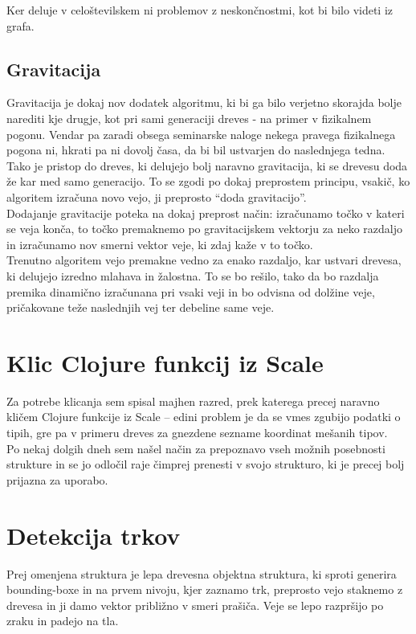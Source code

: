 \documentclass[10pt,a4paper,oneside]{book}
\def\pa{\\[-6pt]}
\begin{document}
Ker deluje v celoštevilskem ni problemov z neskončnostmi, kot bi bilo
videti iz grafa.

\subsection{Gravitacija}
Gravitacija je dokaj nov dodatek algoritmu, ki bi ga bilo verjetno
skorajda bolje narediti kje drugje, kot pri sami generaciji dreves -
na primer v fizikalnem pogonu. Vendar pa zaradi obsega seminarske
naloge nekega pravega fizikalnega pogona ni, hkrati pa ni dovolj časa,
da bi bil ustvarjen do naslednjega tedna.\pa

Tako je pristop do dreves, ki delujejo bolj naravno gravitacija, ki se
drevesu doda že kar med samo generacijo. To se zgodi po dokaj
preprostem principu, vsakič, ko algoritem izračuna novo vejo, ji
preprosto ``doda gravitacijo''.\pa

Dodajanje gravitacije poteka na dokaj preprost način: izračunamo točko
v kateri se veja konča, to točko premaknemo po gravitacijskem vektorju
za neko razdaljo in izračunamo nov smerni vektor veje, ki zdaj kaže v
to točko.\pa

Trenutno algoritem vejo premakne vedno za enako razdaljo, kar ustvari
drevesa, ki delujejo izredno mlahava in žalostna. To se bo rešilo,
tako da bo razdalja premika dinamično izračunana pri vsaki veji in bo
odvisna od dolžine veje, pričakovane teže naslednjih vej ter debeline
same veje.

\section{Klic Clojure funkcij iz Scale}
Za potrebe klicanja sem spisal majhen razred, prek katerega precej naravno kličem Clojure funkcije iz Scale -- edini problem je da se vmes zgubijo podatki o tipih, gre pa v primeru dreves za gnezdene sezname koordinat mešanih tipov.\pa

Po nekaj dolgih dneh sem našel način za prepoznavo vseh možnih posebnosti strukture in se jo odločil raje čimprej prenesti v svojo strukturo, ki je precej bolj prijazna za uporabo.

\section{Detekcija trkov}
Prej omenjena struktura je lepa drevesna objektna struktura, ki sproti generira bounding-boxe in na prvem nivoju, kjer zaznamo trk, preprosto vejo staknemo z drevesa in ji damo vektor približno v smeri prašiča. Veje se lepo razpršijo po zraku in padejo na tla.
\end{document}

